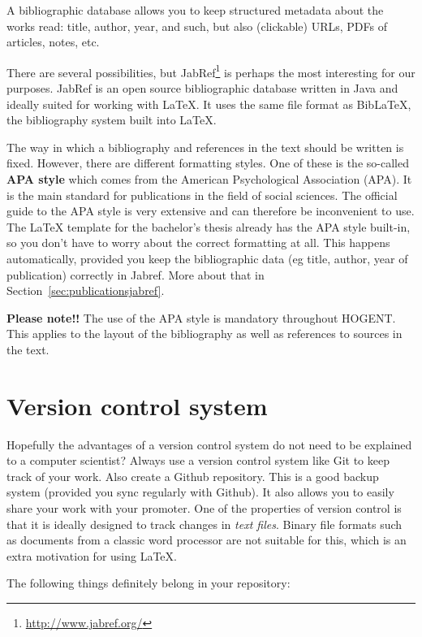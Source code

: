 A bibliographic database allows you to keep structured metadata about the works read: title, author, year, and such, but also (clickable) URLs, PDFs of articles, notes, etc.

There are several possibilities, but JabRef\footnote{\url{http://www.jabref.org/}} is perhaps the most interesting for our purposes. JabRef is an open source bibliographic database written in Java and ideally suited for working with {\LaTeX}. It uses the same file format as Bib{\LaTeX}, the bibliography system built into {\LaTeX}.

The way in which a bibliography and references in the text should be written is fixed. However, there are different formatting styles. One of these is the so-called \textbf{APA style} which comes from the American Psychological Association (APA). It is the main standard for publications in the field of social sciences. The official guide to the APA style is very extensive and can therefore be inconvenient to use. The {\LaTeX} template for the bachelor's thesis already has the APA style built-in, so you don't have to worry about the correct formatting at all. This happens automatically, provided you keep the bibliographic data (eg title, author, year of publication) correctly in Jabref. More about that in Section~\ref{sec:publicationsjabref}.

\textbf{Please note!!} The use of the APA style is mandatory throughout HOGENT. This applies to the layout of the bibliography as well as references to sources in the text.

\section{Version control system}
\label{sec:versioncontrolsystem}

Hopefully the advantages of a version control system do not need to be explained to a computer scientist? Always use a version control system like Git to keep track of your work. Also create a Github repository. This is a good backup system (provided you sync regularly with Github). It also allows you to easily share your work with your promoter. One of the properties of version control is that it is ideally designed to track changes in \emph{text files}. Binary file formats such as documents from a classic word processor are not suitable for this, which is an extra motivation for using \LaTeX{}.

The following things definitely belong in your repository:

